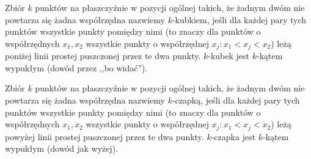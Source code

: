 \begin{definition}
	Zbiór $k$ punktów na płaszczyźnie w pozycji ogólnej takich, że żadnym dwóm nie powtarza się żadna współrzędna nazwiemy $k$-kubkiem, jeśli dla każdej pary tych punktów wszystkie punkty pomiędzy nimi (to znaczy dla punktów o współrzędnych $x_1,x_2$ wszystkie punkty o współrzędnej $x_j : x_1 < x_j < x_2$) leżą poniżej linii prostej puszczonej przez te dwa punkty. $k$-kubek jest $k$-kątem wypukłym (dowód przez ,,bo widać'').
\end{definition}

\begin{definition}
	Zbiór $k$ punktów na płaszczyźnie w pozycji ogólnej takich, że żadnym dwóm nie powtarza się żadna współrzędna nazwiemy $k$-czapką, jeśli dla każdej pary tych punktów wszystkie punkty pomiędzy nimi (to znaczy dla punktów o współrzędnych $x_1,x_2$ wszystkie punkty o współrzędnej $x_j : x_1 < x_j < x_2$) leżą powyżej linii prostej puszczonej przez te dwa punkty. $k$-czapka jest $k$-kątem wypukłym (dowód jak wyżej).
\end{definition}

